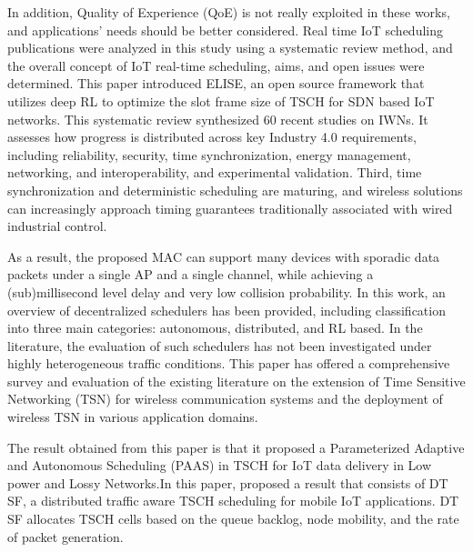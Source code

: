 \documentclass[a4paper,fleqn]{cas-dc}
\numberwithin{equation}{section}
\begin{document}
In addition, Quality of Experience (QoE) is not really exploited in these works, and applications’ needs should be better considered. Real time IoT scheduling publications\cite{abolhassani2022real} were analyzed in this study using a systematic review method, and the overall concept of IoT real-time scheduling, aims, and open issues were determined. This paper introduced ELISE,\cite{jurado2024elise} an open source framework that utilizes deep RL to optimize the slot frame size of TSCH for SDN based IoT networks. This systematic review synthesized \cite{richter2023usability}60 recent studies on IWNs. It assesses how progress is distributed across key Industry 4.0 requirements, including reliability, security, time synchronization, energy management, networking, and interoperability, and experimental validation. Third, time synchronization and deterministic scheduling are maturing, and wireless solutions can increasingly approach timing guarantees traditionally associated with wired industrial control. 

As a result, \cite{gao2020mac}the proposed MAC can support many devices with sporadic data packets under a single AP and a single channel, while achieving a (sub)millisecond level delay and very low collision probability. In this work, \cite{kherbache2023decentralized}an overview of decentralized schedulers has been provided, including classification into three main categories: autonomous, distributed, and RL based. In the literature, the evaluation of such schedulers has not been investigated under highly heterogeneous traffic conditions. This paper has offered a comprehensive survey\cite{zanbouri2024comprehensive} and evaluation of the existing literature on the extension of Time Sensitive Networking (TSN) for wireless communication systems and the deployment of wireless TSN in various application domains. 

The result obtained from this paper\cite{tavallaie2021design} is that it proposed a Parameterized Adaptive and Autonomous Scheduling (PAAS) in TSCH for IoT data delivery in Low power and Lossy Networks.In this paper\cite{jung2018parameterized}, proposed a result that consists of DT SF, a distributed traffic aware TSCH scheduling for mobile IoT applications.
DT SF allocates TSCH cells based on the queue backlog, node mobility, and the rate of packet generation.
\end{document}
